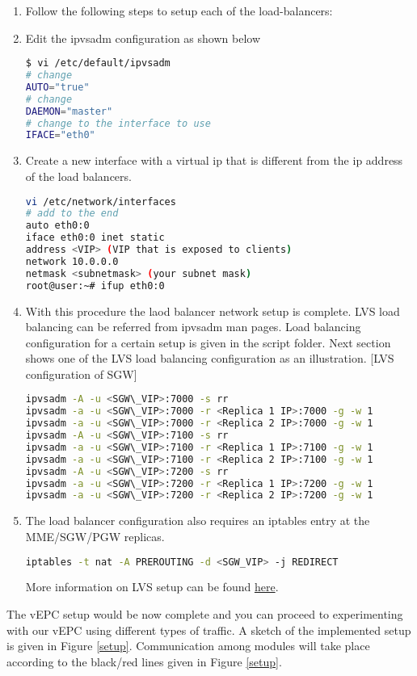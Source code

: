 \pdfminorversion=4\documentclass[hidelinks]{report}
\begin{document}
\begin{enumerate}
\item Follow the following steps to setup each of the load-balancers:

\item Edit the ipvsadm configuration as shown below
\begin{lstlisting}[language=bash]
$ vi /etc/default/ipvsadm
# change
AUTO="true"
# change
DAEMON="master"
# change to the interface to use
IFACE="eth0"
\end{lstlisting}
\item Create a new interface with a virtual ip that is different from the ip address of the load balancers.
\begin{lstlisting}[language=bash]
vi /etc/network/interfaces
# add to the end
auto eth0:0
iface eth0:0 inet static
address <VIP> (VIP that is exposed to clients)
network 10.0.0.0
netmask <subnetmask> (your subnet mask)
root@user:~# ifup eth0:0 
\end{lstlisting}
\item With this procedure the laod balancer network setup is complete. LVS load balancing can be referred from ipvsadm man pages. Load balancing configuration for a certain setup is given in the script folder. Next section shows one of the LVS load balancing configuration as an illustration.
[LVS configuration of SGW]
\begin{lstlisting}[language=bash]
ipvsadm -A -u <SGW\_VIP>:7000 -s rr
ipvsadm -a -u <SGW\_VIP>:7000 -r <Replica 1 IP>:7000 -g -w 1
ipvsadm -a -u <SGW\_VIP>:7000 -r <Replica 2 IP>:7000 -g -w 1
ipvsadm -A -u <SGW\_VIP>:7100 -s rr
ipvsadm -a -u <SGW\_VIP>:7100 -r <Replica 1 IP>:7100 -g -w 1
ipvsadm -a -u <SGW\_VIP>:7100 -r <Replica 2 IP>:7100 -g -w 1
ipvsadm -A -u <SGW\_VIP>:7200 -s rr
ipvsadm -a -u <SGW\_VIP>:7200 -r <Replica 1 IP>:7200 -g -w 1
ipvsadm -a -u <SGW\_VIP>:7200 -r <Replica 2 IP>:7200 -g -w 1
\end{lstlisting}
\item The load balancer configuration also requires an iptables entry at the MME/SGW/PGW replicas.
\begin{lstlisting}[language=bash]
iptables -t nat -A PREROUTING -d <SGW_VIP> -j REDIRECT
\end{lstlisting}
More information on LVS setup can be found  \href{https://www.server-world.info/en/note?os=Ubuntu_14.04&p=lvs}{\color{blue}here}.
\end{enumerate}

The vEPC setup would be now complete and you can proceed to experimenting with our vEPC using different types of traffic. A sketch of the implemented setup is given in Figure \ref{setup}. Communication among modules will take place according to the black/red  lines given in Figure \ref{setup}.
\end{document}
